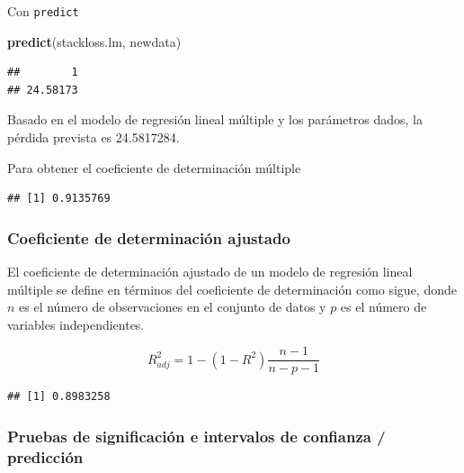\documentclass[]{article}
\newenvironment{Shaded}{\begin{snugshade}}{\end{snugshade}}
\newcommand{\KeywordTok}[1]{\textcolor[rgb]{0.13,0.29,0.53}{\textbf{{#1}}}}
\newcommand{\NormalTok}[1]{{#1}}
\numberwithin{equation}{section}
\begin{document}
Con \texttt{predict}

\begin{Shaded}
\begin{Highlighting}[]
\KeywordTok{predict}\NormalTok{(stackloss.lm, newdata) }
\end{Highlighting}
\end{Shaded}

\begin{verbatim}
##        1 
## 24.58173
\end{verbatim}

Basado en el modelo de regresión lineal múltiple y los parámetros dados,
la pérdida prevista es 24.5817284.

Para obtener el coeficiente de determinación múltiple

\begin{Shaded}
\end{Shaded}

\begin{verbatim}
## [1] 0.9135769
\end{verbatim}

\subsubsection{Coeficiente de determinación
ajustado}\label{coeficiente-de-determinacion-ajustado}

El coeficiente de determinación ajustado de un modelo de regresión
lineal múltiple se define en términos del coeficiente de determinación
como sigue, donde \(n\) es el número de observaciones en el conjunto de
datos y \(p\) es el número de variables independientes.

\[
R^2_{adj} = 1-(1-R^2)\frac{n-1}{n-p-1}
\]

\begin{Shaded}
\end{Shaded}

\begin{verbatim}
## [1] 0.8983258
\end{verbatim}

\subsubsection{Pruebas de significación e intervalos de confianza /
predicción}\label{pruebas-de-significacion-e-intervalos-de-confianza-prediccion}
\end{document}
